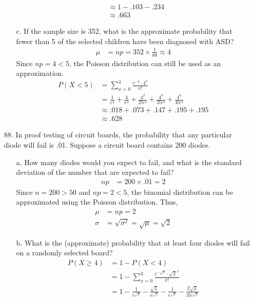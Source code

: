 \documentclass[letterpaper,12pt]{article}
\newcommand{\poisson}[2]{%
  \frac{e^{-#2} \cdot #2^{#1}}{#1!}%
}
\newcommand{\poissonsum}[3]{%
  \sum_{x = #1}^{#2} \poisson{x}{#3}%
}
\begin{document}
\begin{enumerate}
\begin{enumerate}
\begin{align*}
          &\approx 1 - .103 - .234 \\
          &\approx .663
        \end{align*}
      \item[c.]
        If the sample size is 352, what is the approximate probability that fewer than 5 of the selected children have been diagnosed with ASD?
        \begin{align*}
          \mu &= np = 352 \times \frac{1}{88} \approx 4
        \end{align*}
        Since $np = 4 < 5$, the Poisson distribution can still be used as an approximation.
        \begin{align*}
          P(X < 5) &= \poissonsum{0}{4}{4} \\
          &= \frac{1}{e^4} + \frac{4}{e^4} + \frac{4^2}{2!e^4} + \frac{4^3}{3!e^4} + \frac{4^4}{4!e^4} \\
          &\approx .018 + .073 + .147 + .195 + .195 \\
          &\approx .628
        \end{align*}
    \end{enumerate}
  \item[88.]
    In proof testing of circuit boards, the probability that any particular diode will fail is .01. Suppose a circuit board contains 200 diodes.
    \begin{enumerate}
      \item[a.]
        How many diodes would you expect to fail, and what is the standard deviation of the number that are expected to fail?
        \begin{align*}
          np &= 200 \times .01 = 2
        \end{align*}
        Since $n = 200 > 50$ and $np = 2 < 5$, the binomial distribution can be approximated using the Poisson distribution. Thus,
        \begin{align*}
          \mu &= np = 2 \\
          \sigma &= \sqrt{\sigma^2} = \sqrt{\mu} = \sqrt{2}
        \end{align*}
      \item[b.]
        What is the (approximate) probability that at least four diodes will fail on a randomly selected board?
        \begin{align*}
          P(X \ge 4) &= 1 - P(X < 4) \\
          &= 1 - \poissonsum{0}{3}{\sqrt{2}} \\
          &= 1 - \frac{1}{e^{\sqrt{2}}} - \frac{\sqrt{2}}{e^{\sqrt{2}}} - \frac{1}{e^{\sqrt{2}}} - \frac{2\sqrt{2}}{3!e^{\sqrt{2}}} \\

\end{align*}
\end{enumerate}
\end{enumerate}
\end{document}
